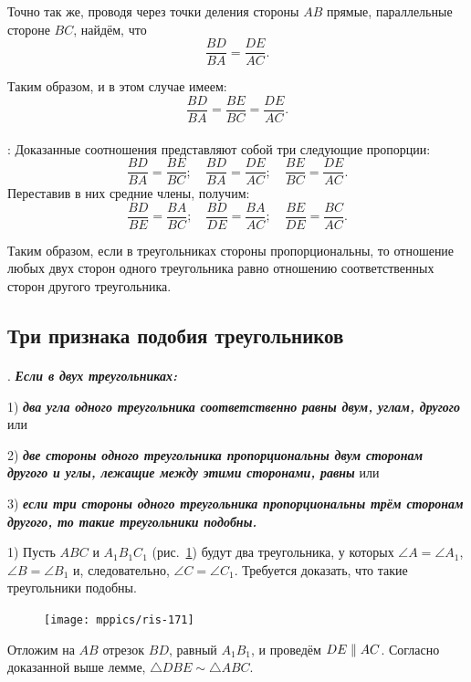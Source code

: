 \documentclass[twoside]{book}
\begin{document}
Точно так же, проводя через точки деления стороны $AB$ прямые, параллельные стороне $BC$, найдём, что
\[\frac{BD}{BA}=\frac{DE}{AC}.\]

Таким образом, и в этом случае имеем:
\[\frac{BD}{BA}=\frac{BE}{BC}=\frac{DE}{AC}.\]


\paragraph{}\label{1938/160}
:
Доказанные соотношения представляют собой три следующие пропорции:
\[\frac{BD}{BA}=\frac{BE}{BC};
\quad
\frac{BD}{BA}=\frac{DE}{AC};
\quad
\frac{BE}{BC}=\frac{DE}{AC}.\]
Переставив в них средние члены, получим:
\[\frac{BD}{BE}=\frac{BA}{BC};
\quad
\frac{BD}{DE}=\frac{BA}{AC};
\quad
\frac{BE}{DE}=\frac{BC}{AC}.\]

Таким образом, если в треугольниках стороны пропорциональны, то отношение любых двух сторон одного треугольника равно отношению соответственных сторон другого треугольника.

\subsection*{Три признака подобия треугольников}

\paragraph{}\label{1938/161}
.
\textbf{\emph{Если в двух треугольниках:}}

1) \textbf{\emph{два угла одного треугольника соответственно равны двум, углам, другого}} или

2) \textbf{\emph{две стороны одного треугольника пропорциональны двум сторонам другого и углы, лежащие между этими сторонами, равны}} или

3) \textbf{\emph{если три стороны одного треугольника пропорциональны трём сторонам другого, то такие треугольники подобны.}}

1) Пусть $ABC$ и $A_1B_1C_1$ (рис.~\ref{1938/ris-171}) будут два треугольника, у которых $\angle A = \angle A_1$, $\angle B=\angle B_1$ и, следовательно, $\angle C=\angle C_1$.
Требуется доказать, что такие треугольники подобны.

\begin{figure}[h!]
\centering
\texttt{[image: mppics/ris-171]}
\caption{}\label{1938/ris-171}
\end{figure}

Отложим на $AB$ отрезок $BD$, равный $A_1B_1$, и проведём $DE\z\parallel AC$.
Согласно доказанной выше лемме, $\triangle DBE\sim\triangle ABC$.
\end{document}
